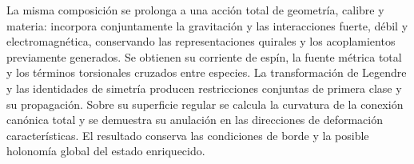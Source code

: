 
La misma composición se prolonga a una acción total de geometría,
calibre y materia: incorpora conjuntamente la gravitación y las
interacciones fuerte, débil y electromagnética, conservando las
representaciones quirales y los acoplamientos previamente generados.
Se obtienen su corriente de espín, la fuente métrica total y los
términos torsionales cruzados entre especies. La transformación de
Legendre y las identidades de simetría producen restricciones
conjuntas de primera clase y su propagación. Sobre su superficie
regular se calcula la curvatura de la conexión canónica total y se
demuestra su anulación en las direcciones de deformación
características. El resultado conserva las condiciones de borde y
la posible holonomía global del estado enriquecido.


